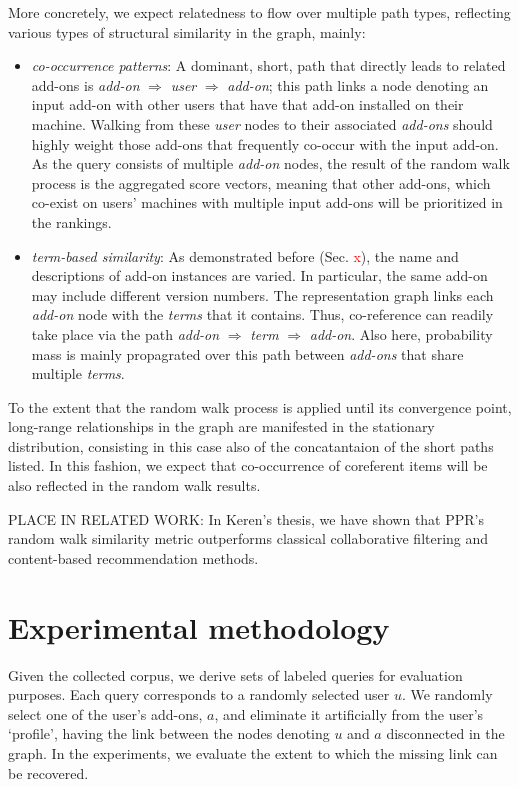 \documentclass[11pt,oneside]{book}
\let\Oldsection\section
\renewcommand{\section}{\FloatBarrier\Oldsection}
\begin{document}
More concretely, we expect relatedness to flow over multiple path
types, reflecting various types of structural similarity in the graph,
mainly:
\begin{itemize}
\item {\it co-occurrence patterns}: A dominant, short, path that
  directly leads to related add-ons is {\it add-on} $\Rightarrow$ {\it user}
   $\Rightarrow$ {\it add-on}; this path links a node denoting an input add-on
  with other users that have that add-on installed on their
  machine. Walking from these {\it user} nodes to their associated
  {\it add-ons} should highly weight those add-ons that frequently
  co-occur with the input add-on. As the query consists of multiple
  {\it add-on} nodes, the result of the random walk process is the
  aggregated score vectors, meaning that other add-ons, which co-exist
  on users' machines with multiple input add-ons will be prioritized
  in the rankings. 
\item {\it term-based similarity}: As demonstrated before
  (Sec. \textcolor{red}{x}), the name and descriptions of add-on
  instances are varied. In particular, the same add-on may include
  different version numbers. The representation graph links each {\it
    add-on} node with the {\it terms} that it contains. Thus,
  co-reference can readily take place via the path {\it add-on}
  $\Rightarrow$ {\it term} $\Rightarrow$ {\it add-on}. Also here,
  probability mass is mainly propagrated over this path between {\it
    add-ons} that share multiple {\it terms}.
\end{itemize}

To the extent that the random walk process is applied until its
convergence point, long-range relationships in the graph are
manifested in the stationary distribution, consisting in this case
also of the concatantaion of the short paths listed. In this fashion,
we expect that co-occurrence of coreferent items will be also
reflected in the random walk results.

PLACE IN RELATED WORK: In Keren's thesis, we have shown that PPR's
random walk similarity metric outperforms classical collaborative
filtering and content-based recommendation methods.


\section{Experimental methodology}

Given the collected corpus, we derive sets of labeled queries for evaluation purposes.  Each query corresponds to a randomly selected user $u$. We randomly select one of the user's add-ons, $a$, and eliminate it artificially from the user's `profile', having the link between the nodes denoting $u$ and $a$ disconnected in the graph. In
the experiments, we evaluate the extent to which the missing link can
be recovered. 
\end{document}
